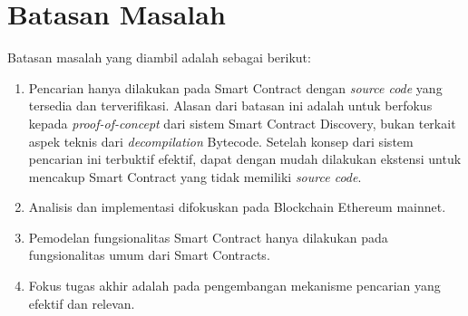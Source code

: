 \section{Batasan Masalah}
\label{sec:batasan-masalah}


Batasan masalah yang diambil adalah sebagai berikut:

\begin{enumerate}
  \item Pencarian hanya dilakukan pada Smart Contract dengan \textit{source code} yang tersedia dan terverifikasi. \newline
  Alasan dari batasan ini adalah untuk berfokus kepada \textit{proof-of-concept} dari sistem Smart Contract Discovery, bukan terkait aspek teknis dari \textit{decompilation} Bytecode. Setelah konsep dari sistem pencarian ini terbuktif efektif, dapat dengan mudah dilakukan ekstensi untuk mencakup Smart Contract yang tidak memiliki \textit{source code}.
  \item Analisis dan implementasi difokuskan pada Blockchain Ethereum mainnet. 
  \item Pemodelan fungsionalitas Smart Contract hanya dilakukan pada fungsionalitas umum dari Smart Contracts. 
  \item Fokus tugas akhir adalah pada pengembangan mekanisme pencarian yang efektif dan relevan.
\end{enumerate}